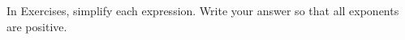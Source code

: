 \begin{exerciseset}{In Exercises}{, simplify each expression. Write your answer so that all exponents are positive.}





\end{exerciseset}
